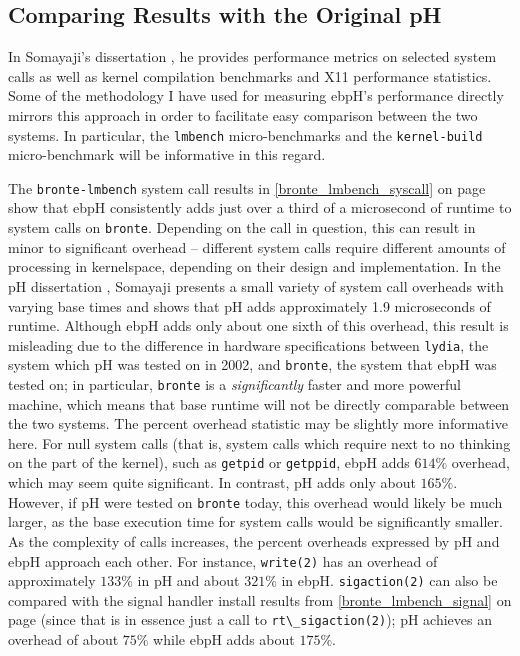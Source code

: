 \documentclass[
  12pt]{findlay}
\newcommand{\passthrough}[1]{#1}
\begin{document}
\hypertarget{comparing-results-with-the-original-ph}{%
\subsection{Comparing Results with the Original
pH}\label{comparing-results-with-the-original-ph}}

In Somayaji's dissertation \autocite{soma02}, he provides performance
metrics on selected system calls as well as kernel compilation
benchmarks and X11 performance statistics. Some of the methodology I
have used for measuring ebpH's performance directly mirrors this
approach in order to facilitate easy comparison between the two systems.
In particular, the \passthrough{\lstinline!lmbench!} micro-benchmarks
and the \passthrough{\lstinline!kernel-build!} micro-benchmark will be
informative in this regard.

The \passthrough{\lstinline!bronte-lmbench!} system call results in
\autoref{bronte_lmbench_syscall} on page
\pageref{bronte_lmbench_syscall} show that ebpH consistently adds just
over a third of a microsecond of runtime to system calls on
\passthrough{\lstinline!bronte!}. Depending on the call in question,
this can result in minor to significant overhead -- different system
calls require different amounts of processing in kernelspace, depending
on their design and implementation. In the pH dissertation
\autocite{soma02}, Somayaji presents a small variety of system call
overheads with varying base times and shows that pH adds approximately
1.9 microseconds of runtime. Although ebpH adds only about one sixth of
this overhead, this result is misleading due to the difference in
hardware specifications between \passthrough{\lstinline!lydia!}, the
system which pH was tested on in 2002, and
\passthrough{\lstinline!bronte!}, the system that ebpH was tested on; in
particular, \passthrough{\lstinline!bronte!} is a \emph{significantly}
faster and more powerful machine, which means that base runtime will not
be directly comparable between the two systems. The percent overhead
statistic may be slightly more informative here. For null system calls
(that is, system calls which require next to no thinking on the part of
the kernel), such as \passthrough{\lstinline!getpid!} or
\passthrough{\lstinline!getppid!}, ebpH adds \(614\%\) overhead, which
may seem quite significant. In contrast, pH adds only about \(165\%\).
However, if pH were tested on \passthrough{\lstinline!bronte!} today,
this overhead would likely be much larger, as the base execution time
for system calls would be significantly smaller. As the complexity of
calls increases, the percent overheads expressed by pH and ebpH approach
each other. For instance, \passthrough{\lstinline!write(2)!} has an
overhead of approximately \(133\%\) in pH and about \(321\%\) in ebpH.
\passthrough{\lstinline!sigaction(2)!} can also be compared with the
signal handler install results from \autoref{bronte_lmbench_signal} on
page \pageref{bronte_lmbench_signal} (since that is in essence just a
call to \passthrough{\lstinline!rt\_sigaction(2)!}); pH achieves an
overhead of about \(75\%\) while ebpH adds about \(175\%\).
\end{document}

